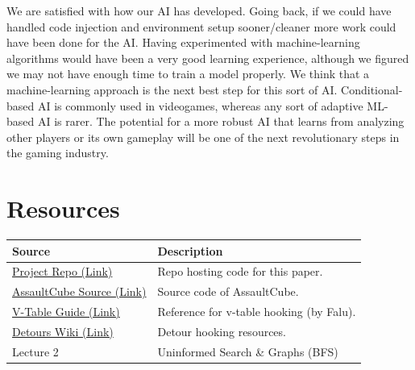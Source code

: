 \documentclass[11pt,a4paper]{article}
\begin{document}
We are satisfied with how our AI has developed. Going back, if we could have handled code injection and environment setup sooner/cleaner more work could have been done for the AI. Having experimented with machine-learning algorithms would have been a very good learning experience, although we figured we may not have enough time to train a model properly. We think that a machine-learning approach is the next best step for this sort of AI. Conditional-based AI is commonly used in videogames, whereas any sort of adaptive ML-based AI is rarer. The potential for a more robust AI that learns from analyzing other players or its own gameplay will be one of the next revolutionary steps in the gaming industry. 

\enlargethispage{14\baselineskip}
\section{Resources}
\begin{table}[H]
    \begin{tabular}{|p{}|p{}|}
        \hline
        \textbf{Source} & \textbf{Description} \\ \hline
        \href{https://github.com/VX59/cse-368-team-project}{Project Repo (Link)} & Repo hosting code for this paper. \\ \hline
        \href{https://github.com/assaultcube/AC}{AssaultCube Source (Link)} & Source code of AssaultCube. \\ \hline
        \href{https://github.com/faluthe/vtable-hook}{V-Table Guide (Link)} & Reference for v-table hooking (by Falu). \\ \hline
        \href{https://github.com/microsoft/Detours/wiki}{Detours Wiki (Link)} & Detour hooking resources. \\ \hline
        Lecture 2 & Uninformed Search \& Graphs (BFS) \\ \hline
    \end{tabular}
\end{table}
\end{document}
